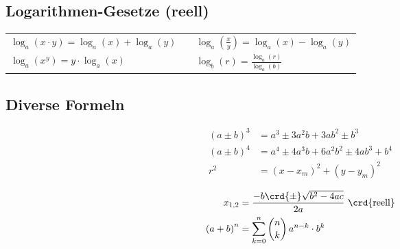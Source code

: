 \subsection{Logarithmen-Gesetze (reell)}

\renewcommand{\arraystretch}{1.5}
\begin{tabular}{lll}
    $\log_a(x \cdot y) = \log_a(x) + \log_a(y)$ & & $\log_a(\frac{x}{y}) = \log_a(x) - \log_a(y)$   \\
    $\log_a(x^y) = y \cdot \log_a(x)$           & & $\log_b(r) = \frac{\log_a(r)}{\log_a(b)}$
\end{tabular}
\renewcommand{\arraystretch}{1}


\subsection{Diverse Formeln}

\vspace{-0.5cm}

\begin{minipage}[t]{0.55\columnwidth}
    \begin{align*}
        (a \pm b)^3 &= a^3 \pm 3a^2b + 3ab^2 \pm b^3            \\
        (a \pm b)^4 &= a^4 \pm 4a^3b + 6a^2b^2 \pm 4ab^3 + b^4  \\
        r^2         &= (x - x_m)^2 + (y - y_m)^2
    \end{align*}
\end{minipage}
\hfill
\begin{minipage}[t]{0.43\columnwidth}
    \begin{align*}
        x_{1,2}             &= \frac{-b \crd{\pm} \sqrt{b^2 - 4ac}}{2a} \text{ \crd{reell}} \\
        \left(a+b\right)^n  &= \sum\limits_{k=0}^n \binom{n}{k} \, a^{n-k} \cdot b^k        \\
    \end{align*}
\end{minipage}

